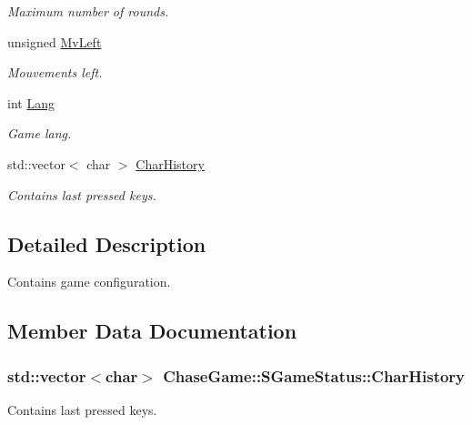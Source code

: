 \begin{DoxyCompactItemize}
\begin{DoxyCompactList}\small\item\em Maximum number of rounds. \end{DoxyCompactList}\item 
unsigned \hyperlink{struct_chase_game_1_1_s_game_status_ae06758bdc7c2bda68801afd314837532}{Mv\-Left}
\begin{DoxyCompactList}\small\item\em Mouvements left. \end{DoxyCompactList}\item 
int \hyperlink{struct_chase_game_1_1_s_game_status_a93c5db2ceb07569075406e865949b4d9}{Lang}
\begin{DoxyCompactList}\small\item\em Game lang. \end{DoxyCompactList}\item 
std\-::vector$<$ char $>$ \hyperlink{struct_chase_game_1_1_s_game_status_a9aa8227d792a823032742d456e43b9a8}{Char\-History}
\begin{DoxyCompactList}\small\item\em Contains last pressed keys. \end{DoxyCompactList}\end{DoxyCompactItemize}


\subsection{Detailed Description}
Contains game configuration. 

\subsection{Member Data Documentation}
\hypertarget{struct_chase_game_1_1_s_game_status_a9aa8227d792a823032742d456e43b9a8}{
\subsubsection[{Char\-History}]{\setlength{\rightskip}{0pt plus 5cm}std\-::vector$<$char$>$ Chase\-Game\-::\-S\-Game\-Status\-::\-Char\-History}}\label{struct_chase_game_1_1_s_game_status_a9aa8227d792a823032742d456e43b9a8}


Contains last pressed keys. 

